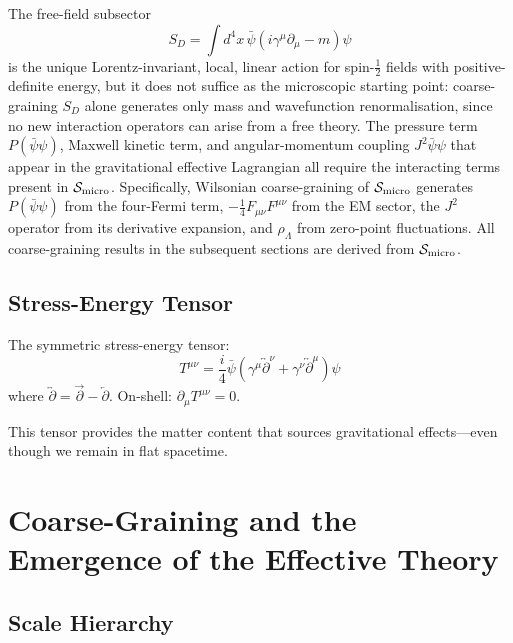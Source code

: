 \documentclass[11pt,a4paper]{article}
\theoremstyle{definition}
\theoremstyle{remark}
\begin{document}
	The free-field subsector
	\begin{equation}
		S_D = \int d^4x\,\bar{\psi}(i\gamma^\mu\partial_\mu - m)\psi
		\label{eq:dirac_action}
	\end{equation}
	is the unique Lorentz-invariant, local, linear action for spin-$\tfrac{1}{2}$ fields with positive-definite energy, but it does not suffice as the microscopic starting point: coarse-graining $S_D$ alone generates only mass and wavefunction renormalisation, since no new interaction operators can arise from a free theory.  The pressure term $P(\bar\psi\psi)$, Maxwell kinetic term, and angular-momentum coupling $J^2\bar\psi\psi$ that appear in the gravitational effective Lagrangian all require the interacting terms present in $\mathcal{S}_{\rm micro}$.  Specifically, Wilsonian coarse-graining of $\mathcal{S}_{\rm micro}$ generates $P(\bar\psi\psi)$ from the four-Fermi term, $-\tfrac{1}{4}F_{\mu\nu}F^{\mu\nu}$ from the EM sector, the $J^2$ operator from its derivative expansion, and $\rho_\Lambda$ from zero-point fluctuations.  All coarse-graining results in the subsequent sections are derived from $\mathcal{S}_{\rm micro}$.

	\subsection{Stress-Energy Tensor}
	
	The symmetric stress-energy tensor:
	\begin{equation}
		T^{\mu\nu} = \frac{i}{4}\bar{\psi}\!\left(\gamma^\mu\overleftrightarrow{\partial}^\nu + \gamma^\nu\overleftrightarrow{\partial}^\mu\right)\!\psi
		\label{eq:stress_energy}
	\end{equation}
	where $\overleftrightarrow{\partial}=\overrightarrow{\partial}-\overleftarrow{\partial}$.  On-shell: $\partial_\mu T^{\mu\nu}=0$.
	
	This tensor provides the matter content that sources gravitational effects---even though we remain in flat spacetime.
	
	\section{Coarse-Graining and the Emergence of the Effective Theory}
	\label{sec:coarse}
	
	\subsection{Scale Hierarchy}
	
\end{document}

